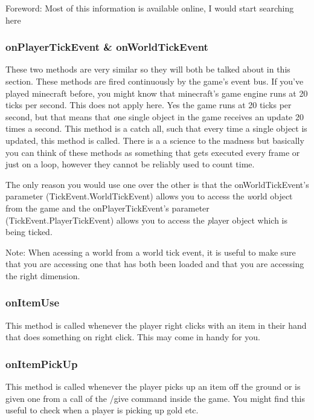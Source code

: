 \documentclass[12pt]{article}
\begin{document}
Foreword: Most of this information is available online, I would start searching here

\subsubsection{onPlayerTickEvent \& onWorldTickEvent}

These two methods are very similar so they will both be talked about in this section. These methods are fired continuously by the game's event bus. If you've played minecraft before, you might know that minecraft's game engine runs at 20 ticks per second. This does not apply here. Yes the game runs at 20 ticks per second, but that means that {\emph one single object} in the game receives an update 20 times a second. This method is a catch all, such that every time a single object is updated, this method is called. There is a a science to the madness but basically you can think of these methods as something that gets executed every frame or just on a loop, however they cannot be reliably used to count time. 

The only reason you would use one over the other is that the onWorldTickEvent's parameter (TickEvent.WorldTickEvent) allows you to access the {\emph world} object from the game and the onPlayerTickEvent's parameter (TickEvent.PlayerTickEvent) allows you to access the {\emph player} object which is being ticked.

Note: When acessing a world from a world tick event, it is useful to make sure that you are accessing one that has both been loaded and that you are accessing the right dimension.

\subsubsection{onItemUse}

This method is called whenever the player right clicks with an item in their hand that does something on right click. This may come in handy for you.

\subsubsection{onItemPickUp}

This method is called whenever the player picks up an item off the ground or is given one from a call of the /give command inside the game. You might find this useful to check when a player is picking up gold etc.
\end{document}
